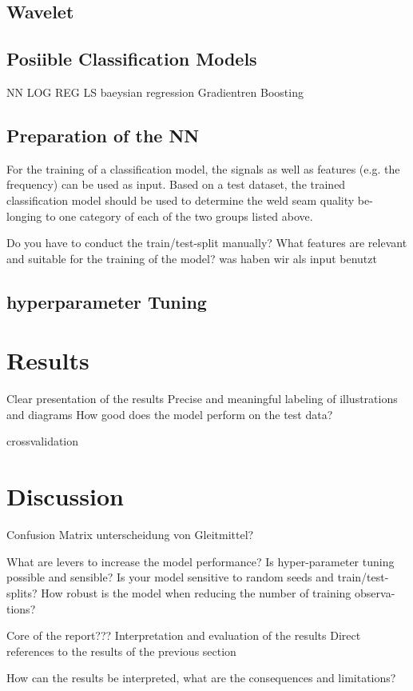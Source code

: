 \documentclass[12pt]{report}
\begin{document}
\section{Wavelet}
\section{Posiible Classification Models} 
NN
LOG REG
LS
baeysian regression
Gradientren Boosting

\section{Preparation of the NN}
For the training of a classification model, the signals as well as features (e.g.
the frequency) can be used as input. Based on a test dataset, the trained
classification model should be used to determine the weld seam quality be-
longing to one category of each of the two groups listed above.

Do you have to conduct the train/test-split manually?
What features are relevant and suitable for the training of the model?
was haben wir als input benutzt

\section{hyperparameter Tuning} 
\chapter{Results}
Clear presentation of the results
Precise and meaningful labeling of illustrations and diagrams
How good does the model perform on the test data? 

crossvalidation
\chapter{Discussion}
Confusion Matrix
unterscheidung von Gleitmittel?

What are levers to increase the model performance? Is hyper-parameter tuning possible and
sensible? Is your model sensitive to random seeds and train/test-splits?
How robust is the model when reducing the number of training observa-
tions?

Core of the report???
Interpretation and evaluation of the results
Direct references to the results of the previous section

How can the results be interpreted, what are the consequences and
limitations?
\end{document}
